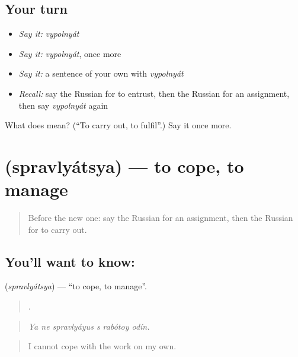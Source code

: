 \subsection*{Your turn}
\begin{itemize}
\raggedright
  \item \emph{Say it:} \emph{vypolnyát}
  \item \emph{Say it:} \emph{vypolnyát}, once more
  \item \emph{Say it:} a sentence of your own with \emph{vypolnyát}
  \item \emph{Recall:} say the Russian for to entrust, then the Russian for an assignment, then say \emph{vypolnyát} again
\end{itemize}

\begin{tcolorbox}[breakable,colback=teal!4,colframe=teal!35!black,title={Before you move on}]
What does  mean? (\textquotedblleft{}To carry out, to fulfil\textquotedblright{}.) Say it once more.
\end{tcolorbox}
\section[\texorpdfstring{\ru{справляться} (spravlyátsya)}{справляться (spravlyátsya)}]{ (spravlyátsya) — to cope, to manage}

\label{lesson:RU-C359-spravlyatsya}



\begin{quote}
Before the new one: say the Russian for an assignment, then the Russian for to carry out.
\end{quote}

\subsection*{You'll want to know: }
\textbf{} (\emph{spravlyátsya}) — \textquotedblleft{}to cope, to manage\textquotedblright{}.

\begin{quote}
     .
\end{quote}

\begin{quote}
\emph{Ya ne spravlyáyus s rabótoy odín.}
\end{quote}

\begin{quote}
I cannot cope with the work on my own.
\end{quote}

